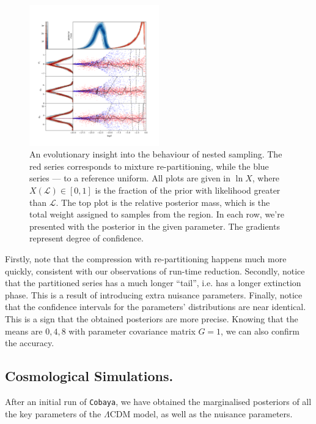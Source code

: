 \documentclass[usenatbib]{mnras}
\begin{document}
\begin{figure}
\includegraphics[width=0.5\textwidth]{./illustrations/higson.png}
\caption{An evolutionary insight into the behaviour of nested sampling. The \color{red} red \color{black} series corresponds to mixture re-partitioning, while the \color{blue} blue \color{black} series --- to a reference uniform. All plots are given in \(\ln X\), where \(X(\mathcal{L}) \in [0,1]\) is the fraction of the prior with likelihood greater than \(\mathcal{L}\). The top plot is the relative posterior mass, which is the total weight assigned to samples from the region. In each row, we're presented with the posterior in the given parameter. The gradients represent degree of confidence. \label{fig:higson}}
\end{figure}

Firstly, note that the compression with re-partitioning happens much
more quickly, consistent with our observations of run-time
reduction. Secondly, notice that the partitioned series has a much
longer ``tail'', i.e. has a longer extinction phase. This is a
result of introducing extra nuisance parameters. Finally, notice
that the confidence intervals for the parameters' distributions are
near identical. This is a sign that the obtained posteriors are more
precise. Knowing that the means are \({0, 4, 8}\) with parameter
covariance matrix \(G = 1\), we can also confirm the accuracy.


\subsection{Cosmological Simulations.}
\label{sec:orgff91a5c}
After an initial run of \texttt{Cobaya}, we have obtained the marginalised
posteriors of all the key parameters of the \(\Lambda\)CDM model,
as well as the nuisance parameters.
\end{document}
